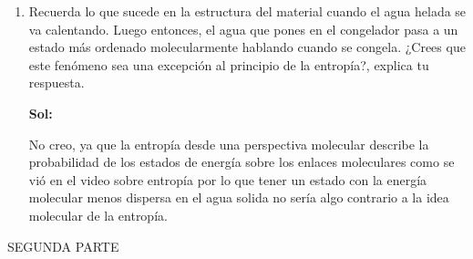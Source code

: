 \documentclass[12pt,a4paper]{article}
\begin{document}
\begin{enumerate}



\item Recuerda lo que sucede en la estructura del material cuando el agua helada se va calentando. Luego entonces, el agua que pones en el congelador pasa a un estado más ordenado molecularmente hablando cuando se congela. ¿Crees que este fenómeno sea una excepción al principio de la entropía?, explica tu respuesta.

\textbf{Sol:}

No creo, ya que la entropía desde una perspectiva molecular describe la probabilidad de los estados de energía sobre los enlaces moleculares como se vió en el video sobre entropía por lo que  tener un estado con la energía molecular menos dispersa en el agua solida no sería algo contrario a la idea molecular de la entropía.

    
\end{enumerate}

SEGUNDA PARTE
\end{document}
